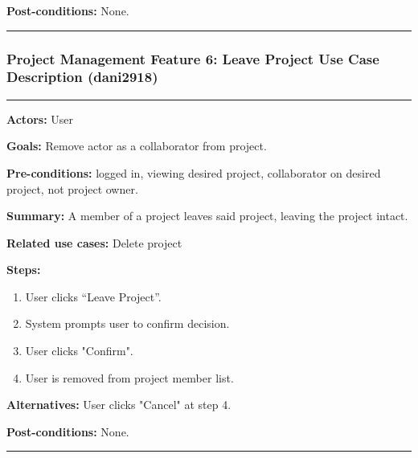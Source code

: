 \documentclass[twoside,letterpaper]{article}
\begin{document}
	 \noindent  \textbf{Post-conditions:} None. \newline
	 \noindent
	\vspace{8pt}
	\hrule
	
	\newpage
	
	
	\subsubsection[Project Management Feature 6: Leave Project Use Case Description (dani2918)]{\rmfamily\bfseries\color{black}
		Project Management Feature 6: Leave Project Use Case Description  (dani2918)}
	\hypertarget{RefHeading22059017292}{}
	\label{pm:uc7}
	\bigskip
	
	\vspace{2pt}
	\hrule
	\vspace{8pt}
	\noindent \textbf{Actors:} User \newline
	
	\noindent \textbf{Goals:} Remove actor as a collaborator from project. \newline
	
	\noindent  \textbf{Pre-conditions:} logged in, viewing desired project, collaborator on desired project, not project owner.  \newline
	
	\noindent \textbf{Summary:} A member of a project leaves said project, leaving the project intact. \newline
	
	\noindent \textbf{Related use cases:} Delete project \newline
	
	\noindent \textbf{Steps:} \begin{enumerate}
	  \item User clicks ``Leave Project''.
	  \item System prompts user to confirm decision.
	  \item User clicks "Confirm".
	  \item User is removed from project member list.
	 \end{enumerate}
	 
	\noindent  \textbf{Alternatives:} User clicks "Cancel" at step 4. \newline
	 
	\noindent  \textbf{Post-conditions:} None. \newline
	\vspace{8pt}
	\hrule
	
	\newpage
	
\end{document}
